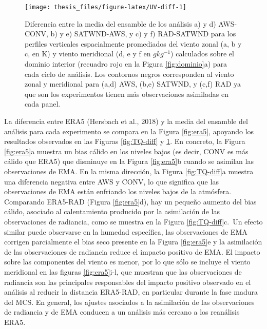 \documentclass[12pt,oneside,a4paper]{reedthesis}
\begin{document}
\begin{figure}

\texttt{[image: thesis\_files/figure-latex/UV-diff-1]} \hfill{}

\caption{Diferencia entre la media del ensamble de los análisis a) y d) AWS-CONV, b) y e) SATWND-AWS, y c) y f) RAD-SATWND para los perfiles verticales espacialmente promediados del viento zonal (a, b y c, en K) y viento meridional (d, e y f en \(gkg^{-1}\)) calculados sobre el dominio interior (recuadro rojo en la Figura \ref{fig:dominio}a) para cada ciclo de análisis. Los contornos negros corresponden al viento zonal y meridional para (a,d) AWS, (b,e) SATWND, y (c,f) RAD ya que son los experimentos tienen más observaciones asimiladas en cada panel.}\label{fig:UV-diff}
\end{figure}
La diferencia entre ERA5 (Hersbach et al., 2018) y la media del ensamble del análisis para cada experimento se compara en la Figura \ref{fig:era5}, apoyando los resultados observados en las Figuras \ref{fig:TQ-diff} y \ref{fig:UV-diff}. En concreto, la Figura \ref{fig:era5}a muestra un bias cálido en los niveles bajos (es decir, CONV es más cálido que ERA5) que disminuye en la Figura \ref{fig:era5}b cuando se asimilan las observaciones de EMA. En la misma dirección, la Figura \ref{fig:TQ-diff}a muestra una diferencia negativa entre AWS y CONV, lo que significa que las observaciones de EMA están enfriando los niveles bajos de la atmósfera. Comparando ERA5-RAD (Figura \ref{fig:era5}d), hay un pequeño aumento del bias cálido, asociado al calentamiento producido por la asimilación de las observaciones de radiancia, como se muestra en la Figura \ref{fig:TQ-diff}c.~Un efecto similar puede observarse en la humedad específica, las observaciones de EMA corrigen parcialmente el bias seco presente en la Figura \ref{fig:era5}e y la asimilación de las observaciones de radiancia reduce el impacto positivo de EMA. El impacto sobre las componentes del viento es menor, por lo que sólo se incluye el viento meridional en las figuras \ref{fig:era5}i-l, que muestran que las observaciones de radiancia son las principales responsables del impacto positivo observado en el análisis al reducir la distancia ERA5-RAD, en particular durante la fase madura del MCS. En general, los ajustes asociados a la asimilación de las observaciones de radiancia y de EMA conducen a un análisis más cercano a los reanálisis ERA5.
\end{document}
